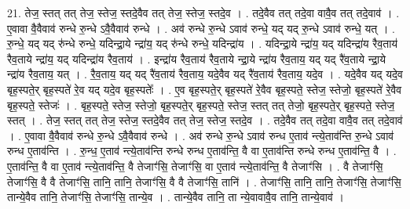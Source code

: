 \documentclass[17pt]{extarticle}
\begin{document}
21. तेज॒ स्तत् तत् तेज॒ स्तेज॒ स्तदे॒वैव तत् तेज॒ स्तेज॒ स्तदे॒व । . तदे॒वैव तत् तदे॒वा वावै॒व तत् तदे॒वाव॑ । . ए॒वावा वै॒वैवाव॑ रुन्धे रु॒न्धे ऽवै॒वैवाव॑ रुन्धे । . अव॑ रुन्धे रु॒न्धे ऽवाव॑ रुन्धे॒ यद् यद् रु॒न्धे ऽवाव॑ रुन्धे॒ यत् । . रु॒न्धे॒ यद् यद् रु॑न्धे रुन्धे॒ यदिन्द्रा॒ये न्द्रा॑य॒ यद् रु॑न्धे रुन्धे॒ यदिन्द्रा॑य । . यदिन्द्रा॒ये न्द्रा॑य॒ यद् यदिन्द्रा॑य रैव॒ताय॑ रैव॒ताये न्द्रा॑य॒ यद् यदिन्द्रा॑य रैव॒ताय॑ । . इन्द्रा॑य रैव॒ताय॑ रैव॒ताये न्द्रा॒ये न्द्रा॑य रैव॒ताय॒ यद् यद् रै॑व॒ताये न्द्रा॒ये न्द्रा॑य रैव॒ताय॒ यत् । . रै॒व॒ताय॒ यद् यद् रै॑व॒ताय॑ रैव॒ताय॒ यदे॒वैव यद् रै॑व॒ताय॑ रैव॒ताय॒ यदे॒व । . यदे॒वैव यद् यदे॒व बृह॒स्पते॒र् बृह॒स्पते॑ रे॒व यद् यदे॒व बृह॒स्पतेः᳚ । . ए॒व बृह॒स्पते॒र् बृह॒स्पते॑ रे॒वैव बृह॒स्पते॒ स्तेज॒ स्तेजो॒ बृह॒स्पते॑ रे॒वैव बृह॒स्पते॒ स्तेजः॑ । . बृह॒स्पते॒ स्तेज॒ स्तेजो॒ बृह॒स्पते॒र् बृह॒स्पते॒ स्तेज॒ स्तत् तत् तेजो॒ बृह॒स्पते॒र् बृह॒स्पते॒ स्तेज॒ स्तत् । . तेज॒ स्तत् तत् तेज॒ स्तेज॒ स्तदे॒वैव तत् तेज॒ स्तेज॒ स्तदे॒व । . तदे॒वैव तत् तदे॒वा वावै॒व तत् तदे॒वाव॑ । . ए॒वावा वै॒वैवाव॑ रुन्धे रु॒न्धे ऽवै॒वैवाव॑ रुन्धे । . अव॑ रुन्धे रु॒न्धे ऽवाव॑ रुन्ध ए॒ताव॑ न्त्ये॒ताव॑न्ति रु॒न्धे ऽवाव॑ रुन्ध ए॒ताव॑न्ति । . रु॒न्ध॒ ए॒ताव॑ न्त्ये॒ताव॑न्ति रुन्धे रुन्ध ए॒ताव॑न्ति॒ वै वा ए॒ताव॑न्ति रुन्धे रुन्ध ए॒ताव॑न्ति॒ वै । . ए॒ताव॑न्ति॒ वै वा ए॒ताव॑ न्त्ये॒ताव॑न्ति॒ वै तेजाꣳ॑सि॒ तेजाꣳ॑सि॒ वा ए॒ताव॑ न्त्ये॒ताव॑न्ति॒ वै तेजाꣳ॑सि । . वै तेजाꣳ॑सि॒ तेजाꣳ॑सि॒ वै वै तेजाꣳ॑सि॒ तानि॒ तानि॒ तेजाꣳ॑सि॒ वै वै तेजाꣳ॑सि॒ तानि॑ । . तेजाꣳ॑सि॒ तानि॒ तानि॒ तेजाꣳ॑सि॒ तेजाꣳ॑सि॒ तान्ये॒वैव तानि॒ तेजाꣳ॑सि॒ तेजाꣳ॑सि॒ तान्ये॒व । . तान्ये॒वैव तानि॒ ता न्ये॒वावावै॒व तानि॒ तान्ये॒वाव॑ । \newline
\end{document}
